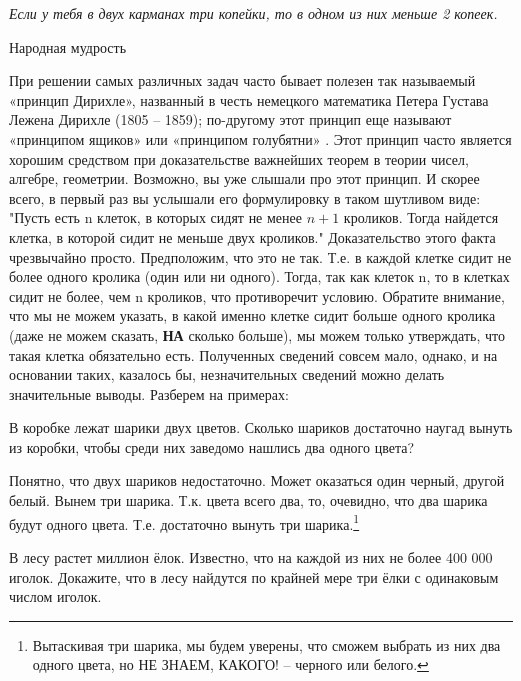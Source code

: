 \epigraph{\textit{Если у тебя в двух карманах три копейки, то в одном из них меньше 2 копеек.}}{Народная мудрость}
При решении самых различных задач часто бывает полезен так называемый «принцип Дирихле», названный в честь немецкого математика Петера Густава Лежена Дирихле (1805 – 1859); по-другому этот принцип еще называют «принципом ящиков» или «принципом голубятни» . Этот принцип часто является хорошим средством при доказательстве важнейших теорем  в теории чисел, алгебре, геометрии. Возможно, вы уже слышали про этот принцип. И скорее всего, в первый раз вы услышали его формулировку в таком шутливом виде: "Пусть есть n клеток, в которых сидят не менее $n+1$ кроликов. Тогда найдется клетка, в которой сидит не меньше двух кроликов." Доказательство этого факта чрезвычайно просто. Предположим, что это не так. Т.е. в каждой клетке сидит не более одного кролика (один или ни одного). Тогда, так как клеток n, то в клетках сидит не более, чем n кроликов, что противоречит условию. Обратите внимание, что мы не можем указать, в какой именно клетке сидит больше одного кролика (даже не можем сказать, \textbf{НА} сколько больше), мы можем только утверждать, что такая клетка обязательно есть. Полученных сведений совсем мало, однако, и на основании таких, казалось бы, незначительных сведений можно делать значительные выводы.
Разберем на примерах:
\begin{thm}
	В коробке лежат шарики двух цветов. Сколько шариков достаточно наугад вынуть из коробки, чтобы среди них заведомо нашлись два одного цвета? 
\end{thm}

\begin{prf}
	Понятно, что двух шариков недостаточно. Может оказаться один черный, другой белый. Вынем три шарика. Т.к. цвета всего два, то, очевидно, что два шарика будут одного цвета. Т.е. достаточно вынуть три шарика.\footnote{Вытаскивая три шарика, мы будем уверены, что сможем выбрать из них два одного цвета, но НЕ ЗНАЕМ, КАКОГО! – черного или белого.}
\end{prf}

\begin{thm}
	В лесу растет миллион ёлок. Известно, что на каждой из них не более 400 000 иголок. Докажите, что в лесу найдутся по крайней мере три ёлки с одинаковым числом иголок.
\end{thm}

